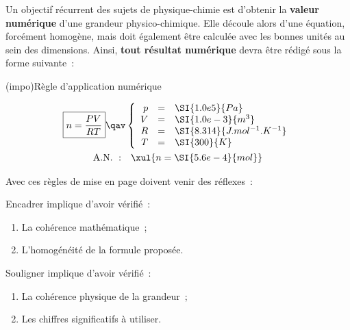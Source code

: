 \documentclass[../main/main.tex]{subfiles}
\begin{document}
Un objectif récurrent des sujets de physique-chimie est d'obtenir la
\textbf{valeur numérique} d'une grandeur physico-chimique. Elle découle alors
d'une équation, forcément homogène, mais doit également être calculée avec les
bonnes unités au sein des dimensions. Ainsi, \textbf{tout résultat numérique}
devra être rédigé sous la forme suivante~:
\begin{tcb}(impo){Règle d'application numérique}
	\vspace*{-10pt}
	\begin{minipage}{0.45\linewidth}
		\begin{gather*}
			\boxed{n = \frac{PV}{RT}}
			\qav
			\left\{
			\begin{array}{rcl}
				p & = & \SI{1.0e5}{Pa}                \\
				V & = & \SI{1.0e-3}{m^3}              \\
				R & = & \SI{8.314}{J.mol^{-1}.K^{-1}} \\
				T & = & \SI{300}{K}
			\end{array}
			\right.\\
			\mathrm{A.N.~:}\quad
			\xul{n = \SI{5.6e-4}{mol}}
		\end{gather*}
	\end{minipage}
	\hfill
	\smallbreak
	Avec ces règles de mise en page doivent venir des réflexes~:
	\smallbreak
	\begin{isd}
		Encadrer implique d'avoir vérifié~:
		\begin{enumerate}
			\item La cohérence mathématique~;
			\item L'homogénéité de la formule proposée.
		\end{enumerate}
		\tcblower
		Souligner implique d'avoir vérifié~:
		\begin{enumerate}
			\item La cohérence physique de la grandeur~;
			\item Les chiffres significatifs à utiliser.
		\end{enumerate}
	\end{isd}
\end{tcb}
\end{document}

